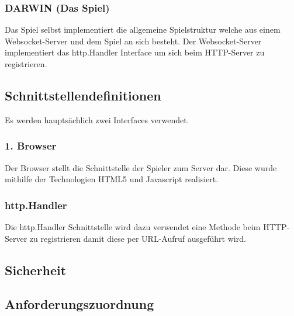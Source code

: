 \subsubsection{DARWIN (Das Spiel)}
Das Spiel selbst implementiert die allgemeine Spielstruktur welche aus einem Websocket-Server und dem Spiel an sich besteht. Der Websocket-Server implementiert das http.Handler Interface um sich beim HTTP-Server zu registrieren.
\subsection{Schnittstellendefinitionen}
Es werden hauptsächlich zwei Interfaces verwendet.
\subsubsection{1. Browser}
Der Browser stellt die Schnittstelle der Spieler zum Server dar. Diese wurde
mithilfe der Technologien HTML5 und Javascript realisiert.
\subsubsection{http.Handler}
Die http.Handler Schnittstelle wird dazu verwendet eine Methode beim HTTP-Server zu registrieren damit diese per URL-Aufruf ausgeführt wird.
\subsection{Sicherheit}
\subsection{Anforderungszuordnung}

